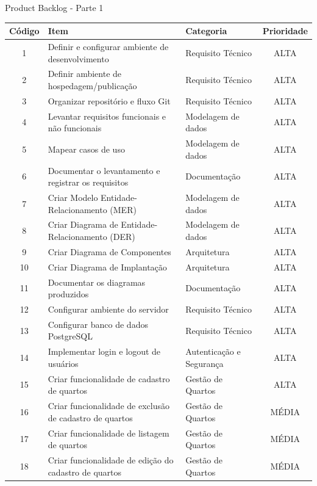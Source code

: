 \documentclass[
	12pt,				%
	openany,			%
	twoside,			%
	a4paper,			%
	english,			%
	french,				%
	spanish,			%
	brazil				%
	]{abntex2}
\begin{document}
\begin{quadro}[H]
	\caption{Product Backlog - Parte 1}
	\label{product_backlog}
	\begin{tabular}{|c|p{6.5cm}|p{3.8cm}|c|}
		\hline
		\textbf{Código} & \textbf{Item} & \textbf{Categoria} & \textbf{Prioridade} \\ \hline
		1 & Definir e configurar ambiente de desenvolvimento & Requisito Técnico   & ALTA    \\ \hline
		2 & Definir ambiente de hospedagem/publicação & Requisito Técnico & ALTA  \\ \hline
		3 & Organizar repositório e fluxo Git  & Requisito Técnico & ALTA\\ \hline
		4 & Levantar requisitos funcionais e não funcionais    & Modelagem de dados & ALTA    \\ \hline
		5 & Mapear casos de uso & Modelagem de dados   & ALTA  \\ \hline
		6 & Documentar o levantamento e registrar os requisitos    & Documentação   & ALTA    \\ \hline
		7 & Criar Modelo Entidade-Relacionamento (MER)    & Modelagem de dados   & ALTA    \\ \hline
		8 & Criar Diagrama de Entidade-Relacionamento (DER)    & Modelagem de dados   & ALTA    \\ \hline
		9 & Criar Diagrama de Componentes    & Arquitetura   & ALTA    \\ \hline
		10 & Criar Diagrama de Implantação    & Arquitetura   & ALTA    \\ \hline
			11 & Documentar os diagramas produzidos & Documentação &
		ALTA \\ \hline
		12 & Configurar ambiente do servidor & Requisito Técnico &
		ALTA \\ \hline
		13 & Configurar banco de dados PostgreSQL & Requisito Técnico &
		ALTA \\ \hline
		14 & Implementar login e logout de usuários & Autenticação e Segurança & ALTA \\ \hline
		15 & Criar funcionalidade de cadastro de quartos & Gestão de Quartos & ALTA \\ \hline
		16 & Criar funcionalidade de exclusão de cadastro de quartos &
		Gestão de Quartos & MÉDIA \\ \hline
		17 & Criar funcionalidade de listagem de quartos & Gestão de Quartos & MÉDIA \\ \hline
		18 & Criar funcionalidade de edição do cadastro de quartos &
		Gestão de Quartos &	MÉDIA \\ \hline

\end{tabular}
\end{quadro}
\end{document}
